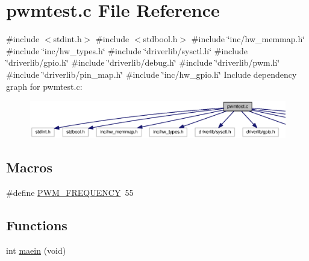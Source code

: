 \section{pwmtest.\+c File Reference}
\label{pwmtest_8c}
{\ttfamily \#include $<$stdint.\+h$>$}\newline
{\ttfamily \#include $<$stdbool.\+h$>$}\newline
{\ttfamily \#include \char`\"{}inc/hw\+\_\+memmap.\+h\char`\"{}}\newline
{\ttfamily \#include \char`\"{}inc/hw\+\_\+types.\+h\char`\"{}}\newline
{\ttfamily \#include \char`\"{}driverlib/sysctl.\+h\char`\"{}}\newline
{\ttfamily \#include \char`\"{}driverlib/gpio.\+h\char`\"{}}\newline
{\ttfamily \#include \char`\"{}driverlib/debug.\+h\char`\"{}}\newline
{\ttfamily \#include \char`\"{}driverlib/pwm.\+h\char`\"{}}\newline
{\ttfamily \#include \char`\"{}driverlib/pin\+\_\+map.\+h\char`\"{}}\newline
{\ttfamily \#include \char`\"{}inc/hw\+\_\+gpio.\+h\char`\"{}}\newline
Include dependency graph for pwmtest.\+c\+:\nopagebreak
\begin{figure}[H]
\begin{center}
\leavevmode
\includegraphics[width=350pt]{pwmtest_8c__incl}
\end{center}
\end{figure}
\subsection*{Macros}
\begin{DoxyCompactItemize}
\item 
\#define \mbox{\hyperlink{pwmtest_8c_a6177eb86ee16a1956c81749e4e332cf0}{P\+W\+M\+\_\+\+F\+R\+E\+Q\+U\+E\+N\+CY}}~55
\end{DoxyCompactItemize}
\subsection*{Functions}
\begin{DoxyCompactItemize}
\item 
int \mbox{\hyperlink{pwmtest_8c_a318e1cba2e294d6cc5be9f5eb176644b}{maein}} (void)
\end{DoxyCompactItemize}


